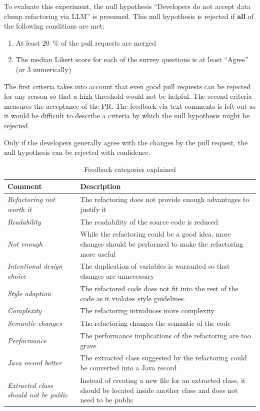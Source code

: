 To evaluate this experiment, the null hypothesis \enquote{Developers do not accept data clump refactoring via \ac{LLM}} is presumed. This null hypothesis is rejected if \textbf{all} of the following conditions are met:

\begin{enumerate}
    \item At least 20~\% of the pull requests are merged
    \item The median Likert score for each of the survey questions is at least \enquote{Agree} (or 3 numerically)
\end{enumerate}

The first criteria takes into account that even good pull requests can be rejected for any reason so that a high threshold would not be helpful. The second criteria measures the acceptance of the PR. The feedback via text comments is left out as it would be difficult to describe a criteria by which the null hypothesis might be rejected.

Only if the developers generally agree with the changes by the pull request, the null hypothesis can be rejected with confidence. 


\begin{table}
\begin{tabular}{p{4cm}|p{10cm}}
	Comment & Description\\\hline
	\textit{Refactoring not worth it} & The refactoring does not provide enough advantages to justify it\\\hline
	\textit{Readability} & The readability of the source code is reduced \\\hline
	\textit{Not enough} & While the refactoring could be a good idea, more changes should be performed to make the refactoring more useful \\\hline
	\textit{Intentional design choice} & The duplication of variables is warranted so that changes are unnecessary \\\hline
	\textit{Style adaption} & The refactored code does not fit into the rest of the code as it violates style guidelines. \\\hline
	\textit{Complexity} & The refactoring introduces more complexity\\\hline
	\textit{Semantic changes} &  The refactoring changes the semantic of the code\\\hline
	\textit{Performance}& The performance implications of the refactoring are too grave \\\hline
	\textit{Java record better} & The extracted class suggested by the refactoring could be converted into a Java record \\\hline
	\textit{Extracted class should not be public} & Instead of creating a new file for an extracted class, it should be located inside another class and does not need to be public \\\hline
	
\end{tabular}
\caption{Feedback categories explained}
\label{tbl:feedback_categories}
\end{table} 




